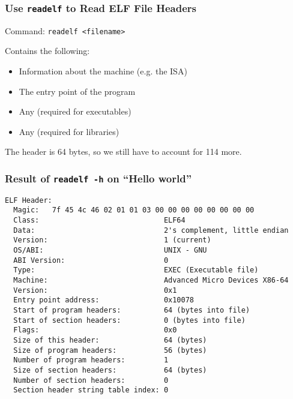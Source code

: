   \begin{frame}
    \frametitle{Use \texttt{readelf} to Read ELF File Headers}

    Command: \hspace{0.5em} \texttt{readelf <filename>}

    \vspace{1em}

    Contains the following:
    \begin{itemize}
      \item Information about the machine (e.g. the ISA)
      \item The entry point of the program
      \item Any  (required for executables)
      \item Any  (required for libraries)
    \end{itemize}

    \vspace{2em}

    The header is 64 bytes, so we still have to account for 114 more.
  \end{frame}

  \begin{frame}[fragile]
    \frametitle{Result of \texttt{readelf -h} on ``Hello world''}

    \begin{lstlisting}[basicstyle=\scriptsize\ttfamily]
ELF Header:
  Magic:   7f 45 4c 46 02 01 01 03 00 00 00 00 00 00 00 00 
  Class:                             ELF64
  Data:                              2's complement, little endian
  Version:                           1 (current)
  OS/ABI:                            UNIX - GNU
  ABI Version:                       0
  Type:                              EXEC (Executable file)
  Machine:                           Advanced Micro Devices X86-64
  Version:                           0x1
  Entry point address:               0x10078
  Start of program headers:          64 (bytes into file)
  Start of section headers:          0 (bytes into file)
  Flags:                             0x0
  Size of this header:               64 (bytes)
  Size of program headers:           56 (bytes)
  Number of program headers:         1
  Size of section headers:           64 (bytes)
  Number of section headers:         0
  Section header string table index: 0
    \end{lstlisting}
  \end{frame}

